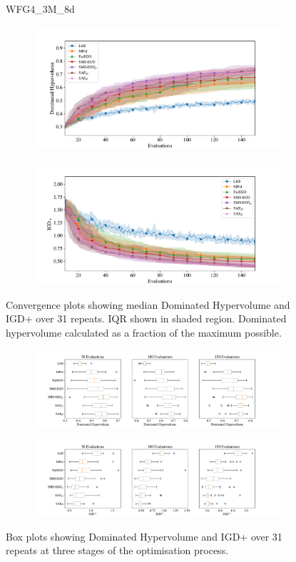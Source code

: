 \documentclass[conference]{IEEEtran}
\begin{document}
\begin{figure}
WFG4\_3M\_8d


\begin{subfigure}[hbt!]{\linewidth}

    \centering
    \includegraphics[width=0.7\linewidth]{figures/wfg4_3obj_8dim_hv_plot.pdf}
\end{subfigure}
\begin{subfigure}[h]{\linewidth}
    \centering
    \includegraphics[width=0.7\linewidth]{figures/wfg4_3obj_8dim_igd_plot.pdf}
\end{subfigure}
    \caption{Convergence plots showing median Dominated Hypervolume and IGD+ over 31 repeats. IQR shown in shaded region. Dominated hypervolume calculated as a fraction of the maximum possible.}
\vspace{\floatsep}
\begin{subfigure}[t]{\linewidth}
    \centering
    \includegraphics[width=0.8\linewidth]{figures/wfg4_3obj_8dim_hv_boxplot.pdf}
\end{subfigure}
\begin{subfigure}[t]{\linewidth}
    \centering
    \includegraphics[width=0.8\linewidth]{figures/wfg4_3obj_8dim_igd_boxplot.pdf}
\end{subfigure}
    \caption{Box plots showing Dominated Hypervolume and IGD+ over 31 repeats at three stages of the optimisation process.}
\end{figure}
\clearpage
\end{document}

